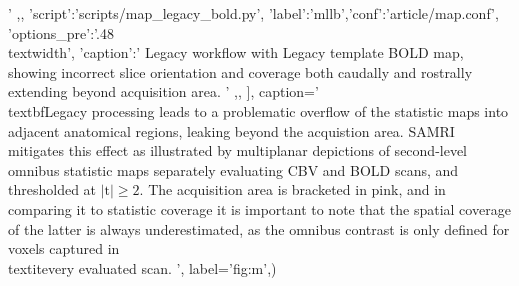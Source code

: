 {{                                '
			,},
		{'script':'scripts/map_legacy_bold.py', 'label':'mllb','conf':'article/map.conf', 'options_pre':'{.48\\textwidth}',
			'caption':'
				Legacy workflow with Legacy template BOLD map, showing incorrect slice orientation and coverage both caudally and rostrally extending beyond acquisition area.
			        '
                        ,},
		],
	caption='
                \\textbf{Legacy processing leads to a problematic overflow of the statistic maps into adjacent anatomical regions, leaking beyond the acquistion area.}
                SAMRI mitigates this effect as illustrated by multiplanar depictions of second-level omnibus statistic maps separately evaluating CBV and BOLD scans, and thresholded at $\mathrm{|t|\geq2}$.
                The acquisition area is bracketed in pink, and in comparing it to statistic coverage it is important to note that the spatial coverage of the latter is always underestimated, as the omnibus contrast is only defined for voxels captured in \\textit{every} evaluated scan.
                ',
	label='fig:m',)}
